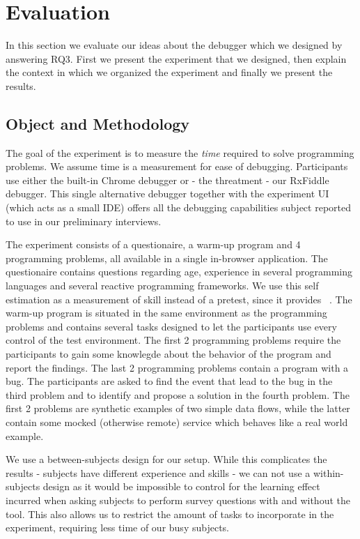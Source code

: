 \section{Evaluation}
In this section we evaluate our ideas about the debugger which we designed by answering RQ3. First we present the experiment that we designed, then explain the context in which we organized the experiment and finally we present the results.

\subsection{Object and Methodology}
The goal of the experiment is to measure the \textit{time} required to solve programming problems. We assume time is a measurement for ease of debugging. Participants use either the built-in Chrome debugger or - the threatment - our RxFiddle debugger. This single alternative debugger together with the experiment UI (which acts as a small IDE) offers all the debugging capabilities subject reported to use in our preliminary interviews. 

The experiment consists of a questionaire, a warm-up program and 4 programming problems, all available in a single in-browser application. The questionaire contains questions regarding age, experience in several programming languages and several reactive programming frameworks. We use this self estimation as  a measurement of skill instead of a pretest, since it provides ~\cite{kleinschmager2011rate,feigenspan2012measuring,siegmund2014measuring}. The warm-up program is situated in the same environment as the programming problems and contains several tasks designed to let the participants use every control of the test environment. The first 2 programming problems require the participants to gain some knowlegde about the behavior of the program and report the findings. The last 2 programming problems contain a program with a bug. The participants are asked to find the event that lead to the bug in the third problem and to identify and propose a solution in the fourth problem. The first 2 problems are synthetic examples of two simple data flows, while the latter contain some mocked (otherwise remote) service which behaves like a real world example.

We use a between-subjects design for our setup. While this complicates the results - subjects have different experience and skills - we can not use a within-subjects design as it would be impossible to control for the learning effect incurred when asking subjects to perform survey questions with and without the tool. This also allows us to restrict the amount of tasks to incorporate in the experiment, requiring less time of our busy subjects.

